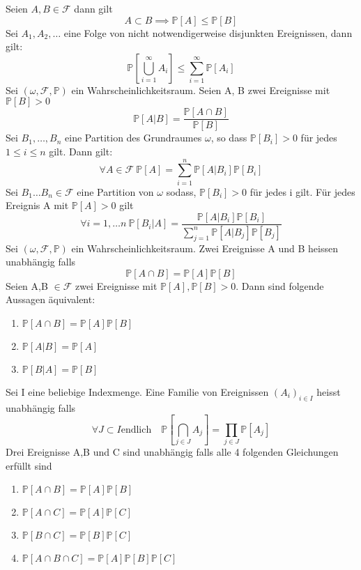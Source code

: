 \Satz[1.8] Seien \(A,B \in \mathcal{F}\) dann gilt \[ A \subset B \implies \mathbb{P}[A] \leq \mathbb{P}[B]\]
\Satz[1.9] Sei \( A_1, A_2, \dots \) eine Folge von nicht notwendigerweise disjunkten Ereignissen, dann gilt: \[ \mathbb{P}[\bigcup_{i=1}^{\infty} A_i] \leq \sum_{i=1}^{\infty} \mathbb{P}[A_i]\]
 \newline
Sei \((\omega, \mathcal{F}, \mathbb{P})\) ein Wahrscheinlichkeitsraum. Seien A, B zwei Ereignisse mit \( \mathbb{P}[B] > 0\) \[\mathbb{P}[A|B] = \frac{\mathbb{P}\left[A \cap B\right]}{\mathbb{P}\left[B\right]}\]
 \newline
Sei  \( B_1, \dots , B_n\) eine Partition des Grundraumes \( \omega \), so dass \( \mathbb{P}[B_i] > 0 \) für jedes \( 1 \leq i \leq n\) gilt. Dann gilt: \[\forall A \in  \mathcal{F} \ \mathbb{P}[A] = \sum_{i=1}^{n} \mathbb{P} \left[A | B_i \right] \mathbb{P}[B_i]\]
 \newline
Sei \( B_1 \dots B_n \in \mathcal{F }\) eine Partition von \( \omega\) sodass, \( \mathbb{P}[B_i] > 0 \) für jedes i gilt. Für jedes Ereignis A mit \( \mathbb{P}[A] > 0 \) gilt  \[ \forall i = 1, \dots n \ \mathbb{P}\left[ B_i | A \right] = \frac{\mathbb{P}[A | B_i] \mathbb{P}[B_i]}{\sum_{j=1}^{n} \mathbb{P}[A | B_j] \mathbb{P}[B_j] }\]
\Def[1.18 Unabhängigkeit] \newline
Sei \( (\omega, \mathcal{F}, \mathbb{P})\) ein Wahrscheinlichkeitsraum. Zwei Ereignisse A und B heissen unabhängig falls \[ \mathbb{P} \left[A \cap B \right] = \mathbb{P}\left[A\right] \mathbb{P} \left[B\right]\]
\Satz[1.20] \newline
Seien A,B \( \in \mathcal{F}\) zwei Ereignisse mit \( \mathbb{P}[A], \mathbb{P}[B] > 0 \). Dann sind folgende Aussagen äquivalent:
\begin{enumerate}
    \item \( \mathbb{P}[A \cap B] = \mathbb{P}[A] \mathbb{P}[B]\)
    \item \( \mathbb{P}[A | B] = \mathbb{P}[A]\)
    \item \( \mathbb{P}[B | A] = \mathbb{P}[B]\)
\end{enumerate}
\Def[1.21]  \newline
Sei I eine beliebige Indexmenge. Eine Familie von Ereignissen \( (A_i)_{i \in I}\) heisst unabhängig falls \[ \forall J \subset I \text{endlich} \quad \mathbb{P}[\bigcap_{j \in J}A_j] = \prod_{j \in J} \mathbb{P}[A_j]\]
\Bem \newline
Drei Ereignisse A,B und C sind unabhängig falls alle 4 folgenden Gleichungen erfüllt sind
\begin{enumerate}
    \item \( \mathbb{P}[A \cap B ] = \mathbb{P}[A] \mathbb{P}[B]\)
    \item \( \mathbb{P}[A \cap C ] = \mathbb{P}[A] \mathbb{P}[C]\)
    \item \( \mathbb{P}[B \cap C ] = \mathbb{P}[B] \mathbb{P}[C]\)
    \item \( \mathbb{P}[A \cap B \cap C  ] = \mathbb{P}[A] \mathbb{P}[B] \mathbb{P}[C]\)
\end{enumerate}